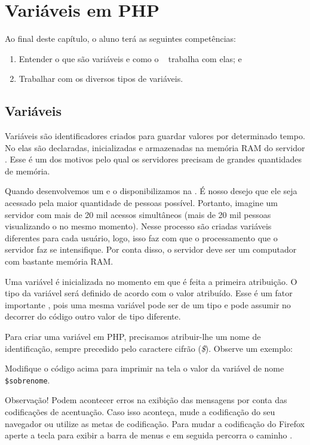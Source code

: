 \chapter{Variáveis em PHP}

Ao final deste capítulo, o aluno terá as seguintes competências:
\begin{enumerate}
    \item Entender o que são variáveis e como o \php~ trabalha com elas; e
    \item Trabalhar com os diversos tipos de variáveis.
\end{enumerate}

\section{Variáveis}
\label{variaveis}

Variáveis são identificadores criados para guardar valores por determinado tempo. 
No \php elas são declaradas, inicializadas e armazenadas na memória RAM do servidor \web. 
Esse é um dos motivos pelo qual os servidores precisam de grandes quantidades de memória.

Quando desenvolvemos um \site e o disponibilizamos na \internet. É nosso desejo que ele seja
acessado pela maior quantidade de pessoas possível. Portanto, imagine um servidor com mais 
de 20 mil acessos simultâneos (mais de 20 mil pessoas visualizando o \site no mesmo momento).
Nesse processo são criadas variáveis diferentes para cada usuário, logo, isso faz com que o 
processamento que o servidor faz se intensifique. Por conta disso, o servidor deve ser um 
computador com bastante memória RAM.

Uma variável é inicializada no momento em que é feita a primeira atribuição. O tipo da
variável será definido de acordo com o valor atribuído. Esse é um fator importante \php, 
pois uma mesma variável pode ser de um tipo e pode assumir no decorrer do código outro 
valor de tipo diferente.

Para criar uma variável em PHP, precisamos atribuir-lhe um nome de identificação, 
sempre precedido pelo caractere cifrão (\textit{\$}). Observe um exemplo:



Modifique o código acima para imprimir na tela o valor da variável de 
nome \texttt{\$sobrenome}.

Observação! Podem acontecer erros na exibição das mensagens por conta 
das codificações de acentuação. Caso isso aconteça, mude a codificação 
do seu navegador ou utilize as metas de codificação. Para mudar a codificação
do Firefox aperte a tecla \keys{\Alt} para exibir a barra de menus e em seguida
percorra o caminho .

